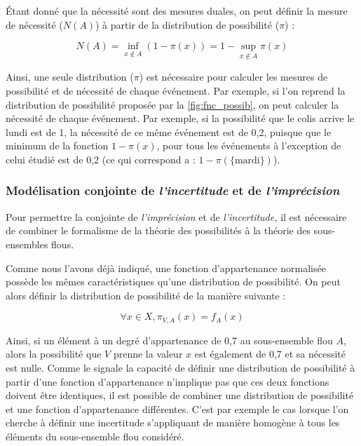 Étant donné que la nécessité sont des mesures duales, on peut définir
la mesure de nécessité (\(N(A)\)) à partir de la distribution de
possibilité (\(π\)) :

\begin{equation}
  N(A) = \inf_{x ∉ A}(1-π(x)) = 1 - \sup_{x ∉ A}π(x)
\end{equation}

Ainsi, une seule distribution (\(\pi\)) est nécessaire pour calculer
les mesures de possibilité et de nécessité de chaque événement. Par
exemple, si l'on reprend la distribution de possibilité proposée par
la \autoref{fig:fnc_possib}, on peut calculer la nécessité de chaque
événement. Par exemple, si la possibilité que le colis arrive le lundi
est de 1, la nécessité de ce même événement est de 0,2, puisque que le
minimum de la fonction \(1-π(x)\), pour tous les événements à
l'exception de celui étudié est de 0,2 (ce qui correspond a :
\(1-π(\{\text{mardi}\})\)).

\subsubsection{Modélisation conjointe de \emph{l'incertitude} et de
  \emph{l'imprécision}}

Pour permettre la conjointe de \emph{l'imprécision} et de
\emph{l'incertitude,} il est nécessaire de combiner le formalisme de
la théorie des possibilités à la théorie des sous-ensembles flous.

Comme nous l'avons déjà indiqué, une fonction d'appartenance
normalisée possède les mêmes caractéristiques qu'une distribution de
possibilité.
On peut alors définir la distribution de possibilité de la manière
suivante :

\begin{equation}
  \forall x \in X, \pi_{V, A}(x)=f_A(x)
\end{equation}

Ainsi, si un élément à un degré d'appartenance de 0,7 au sous-ensemble
flou \(A\), alors la possibilité que \(V\) prenne la valeur \(x\) est
également de 0,7 et sa nécessité est nulle.
%
Comme le signale \textcite{Bouchon-Meunier1995} la capacité de définir
une distribution de possibilité à partir d'une fonction d'appartenance
n'implique pas que ces deux fonctions doivent être identiques, il est
possible de combiner une distribution de possibilité et une fonction
d'appartenance différentes.
%
C'est par exemple le cas lorsque l'on cherche à définir une
incertitude s'appliquant de manière homogène à tous les éléments du
sous-ensemble flou considéré.

